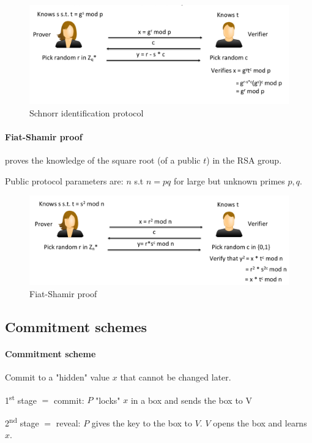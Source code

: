 \begin{figure}[h]
    \centering
    \includegraphics[width=12cm]{images/ch6-schnorr.png}
    \caption{Schnorr identification protocol}
    \label{fig:schnorr}
\end{figure}

\paragraph{Fiat-Shamir proof} proves the knowledge of the square root (of a public $t$) in the RSA group.

Public protocol parameters are: $n$ s.t $n=pq$ for large but unknown primes $p, q$.

\begin{figure}[h]
    \centering
    \includegraphics[width=12cm]{images/ch6-fiat-shamir.png}
    \caption{Fiat-Shamir proof}
    \label{fig:fiat-shamir}
\end{figure}


\pagebreak
\subsection{Commitment schemes}

\paragraph{Commitment scheme} Commit to a "hidden" value $x$ that cannot be changed later.

1\textsuperscript{st} stage $=$ commit: $P$ "locks" $x$ in a box and sends the box to V

2\textsuperscript{nd} stage $=$ reveal: $P$ gives the key to the box to $V$. $V$ opens the box and learns $x$.

